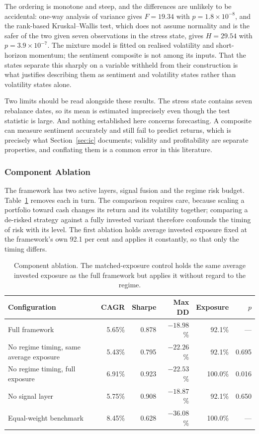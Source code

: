 \documentclass{singlecol-new}
\theoremstyle{TH}{
\newtheorem{lemma}{Lemma}
\newtheorem{theorem}[lemma]{Theorem}
\newtheorem{corrolary}[lemma]{Corrolary}
\newtheorem{conjecture}[lemma]{Conjecture}
\newtheorem{proposition}[lemma]{Proposition}
\newtheorem{claim}[lemma]{Claim}
\newtheorem{stheorem}[lemma]{Wrong Theorem}
\newtheorem{algorithm}{Algorithm}
}
\theoremstyle{THrm}{
\newtheorem{definition}{Definition}[section]
\newtheorem{question}{Question}[section]
\newtheorem{remark}{Remark}
\newtheorem{scheme}{Scheme}
}
\theoremstyle{THhit}{
\newtheorem{case}{Case}[section]
}
\begin{document}
The ordering is monotone and steep, and the differences are unlikely to be accidental:
one-way analysis of variance gives $F = 19.34$ with $p = 1.8 \times 10^{-8}$, and the
rank-based Kruskal--Wallis test, which does not assume normality and is the safer of the
two given seven observations in the stress state, gives $H = 29.54$ with
$p = 3.9 \times 10^{-7}$. The mixture model is fitted on realised volatility and
short-horizon momentum; the sentiment composite is not among its inputs. That the states
separate this sharply on a variable withheld from their construction is what justifies
describing them as sentiment and volatility states rather than volatility states alone.

Two limits should be read alongside these results. The stress state contains seven
rebalance dates, so its mean is estimated imprecisely even though the test statistic is
large. And nothing established here concerns forecasting. A composite can measure
sentiment accurately and still fail to predict returns, which is precisely what
Section~\ref{sec:ic} documents; validity and profitability are separate properties, and
conflating them is a common error in this literature.

\subsubsection{Component Ablation}
\label{sec:ablation}

The framework has two active layers, signal fusion and the regime risk budget.
Table~\ref{tab:ablation} removes each in turn. The comparison requires care, because
scaling a portfolio toward cash changes its return and its volatility together; comparing
a de-risked strategy against a fully invested variant therefore confounds the timing of
risk with its level. The first ablation holds average invested exposure fixed at the
framework's own 92.1 per cent and applies it constantly, so that only the timing differs.

\begin{table}[!ht]
\centering
\caption{Component ablation. The matched-exposure control holds the same average
invested exposure as the full framework but applies it without regard to the regime.}
\label{tab:ablation}
\footnotesize
\begin{tabular}{p{4.8cm}rrrrr}
\hline
\textbf{Configuration} & \textbf{CAGR} & \textbf{Sharpe} & \textbf{Max DD} & \textbf{Exposure} & \textbf{$p$} \\
\hline
Full framework & 5.65\% & 0.878 & $-18.98$\% & 92.1\% & --- \\
No regime timing, same average exposure & 5.43\% & 0.795 & $-22.26$\% & 92.1\% & 0.695 \\
No regime timing, full exposure & 6.91\% & 0.923 & $-22.53$\% & 100.0\% & 0.016 \\
No signal layer & 5.75\% & 0.908 & $-18.87$\% & 92.1\% & 0.650 \\
Equal-weight benchmark & 8.45\% & 0.628 & $-36.08$\% & 100.0\% & --- \\
\hline
\end{tabular}
\end{table}
\end{document}
